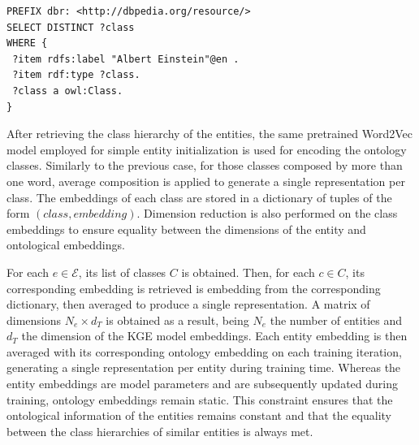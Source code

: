 \begin{lstlisting}[captionpos=b, float=tp,floatplacement=tbp, caption=Example of a SPARQL query used to retrieve the class hierarchy of the entity ``Albert Einstein''., label=lst:sparql,basicstyle=\ttfamily,frame=single]
PREFIX dbr: <http://dbpedia.org/resource/>
SELECT DISTINCT ?class
WHERE {
 ?item rdfs:label "Albert Einstein"@en .
 ?item rdf:type ?class.
 ?class a owl:Class.
}
\end{lstlisting}

After retrieving the class hierarchy of the entities, the same pretrained Word2Vec model employed for simple entity initialization is used for encoding the ontology classes. Similarly to the previous case, for those classes composed by more than one word, average composition is applied to generate a single representation per class. The embeddings of each class are stored in a dictionary of tuples of the form $(class, embedding)$. Dimension reduction is also performed on the class embeddings to ensure equality between the dimensions of the entity and ontological embeddings.

For each $e \in \mathcal{E}$, its list of classes $C$ is obtained. Then, for each $c \in C$, its corresponding embedding is retrieved is embedding from the corresponding dictionary, then averaged to produce a single representation. A matrix of dimensions $N_e \times d_T$ is obtained as a result, being $N_e$ the number of entities and $d_T$ the dimension of the KGE model embeddings. Each entity embedding is then averaged with its corresponding ontology embedding on each training iteration, generating a single representation per entity during training time. Whereas the entity embeddings are model parameters and are subsequently updated during training, ontology embeddings remain static. This constraint ensures that the ontological information of the entities remains constant and that the equality between the class hierarchies of similar entities is always met.

